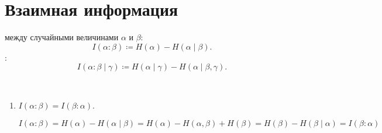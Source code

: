 \section{Взаимная информация}
\begin{defn}
	 между случайными величинами $  \alpha $ и $ \beta $:
	\[
		I( \alpha  : \beta ) \coloneqq H( \alpha ) - H( \alpha \mid \beta )
	.\] 
	:
		\[
			I ( \alpha : \beta \mid \gamma ) \coloneqq  H( \alpha  \mid \gamma ) - H( \alpha  \mid \beta , \gamma )
		.\] 
\end{defn}
\begin{prop}
	~\begin{enumerate}
		\item $ I( \alpha : \beta ) = I( \beta : \alpha )$.
			\begin{proof*}
				$ I( \alpha : \beta ) = H( \alpha ) - H( \alpha \mid \beta ) = H( \alpha ) - H( \alpha , \beta ) + H( \beta ) = H( \beta ) - H( \beta \mid \alpha ) = I( \beta : \alpha )$
			\end{proof*}


\end{enumerate}
\end{prop}
